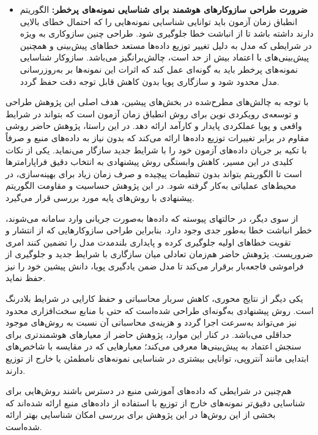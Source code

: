 \begin{itemize}
	\item \textbf{ضرورت طراحی سازوکار‌های هوشمند برای شناسایی نمونه‌های پرخطر:}
	الگوریتم انطباق زمان آزمون باید توانایی شناسایی نمونه‌هایی را که احتمال خطای بالایی دارند داشته باشد 
	تا از انباشت خطا جلوگیری شود. طراحی چنین سازوکاری به ویژه در شرایطی که مدل به دلیل تغییر توزیع داده‌ها 
	مستعد خطاهای پیش‌بینی و همچنین پیش‌بینی‌های با {اعتماد بیش از حد} است، 
	چالش‌برانگیز می‌باشد. سازوکار شناسایی {نمونه‌های پرخطر} باید به گونه‌ای عمل کند 
	که اثرات این نمونه‌ها بر به‌روزرسانی مدل محدود شود و سازگاری پویا بدون کاهش قابل توجه دقت حفظ گردد.
\end{itemize}



با توجه به چالش‌های مطرح‌شده در بخش‌های پیشین، هدف اصلی این پژوهش طراحی و توسعه‌ی رویکردی نوین برای روش انطباق زمان آزمون است که بتواند در شرایط واقعی و پویا عملکردی پایدار و کارآمد ارائه دهد. در این راستا، پژوهش حاضر روشی مقاوم در برابر تغییرات توزیع داده‌ها ارائه می‌کند که بدون نیاز به داده‌های منبع و صرفاً با تکیه بر جریان داده‌های آزمون خود را با شرایط جدید سازگار می‌نماید. یکی از نکات کلیدی در این مسیر، کاهش وابستگی روش پیشنهادی به انتخاب دقیق فراپارامترها است تا الگوریتم بتواند بدون تنظیمات پیچیده و صرف زمان زیاد برای بهینه‌سازی، در محیط‌های عملیاتی به‌کار گرفته شود. در این پژوهش حساسیت و مقاومت الگوریتم پیشنهادی با روش‌های پایه مورد بررسی قرار می‌گیرد.

از سوی دیگر، در حالتهای پیوسته که داده‌ها به‌صورت جریانی وارد سامانه می‌شوند، خطر انباشت خطا به‌طور جدی وجود دارد. بنابراین طراحی سازوکار‌هایی که از انتشار و تقویت خطاهای اولیه جلوگیری کرده و پایداری بلندمدت مدل را تضمین کنند امری ضروریست. پژوهش حاضر هم‌زمان تعادلی میان سازگاری با شرایط جدید و جلوگیری از فراموشی فاجعه‌بار برقرار می‌کند تا مدل ضمن یادگیری پویا، دانش پیشین خود را نیز حفظ نماید.

یکی دیگر از نتایج محوری، کاهش سربار محاسباتی و حفظ کارایی در شرایط بلادرنگ است. روش پیشنهادی به‌گونه‌ای طراحی شده‌است که حتی با منابع سخت‌افزاری محدود نیز می‌تواند به‌سرعت اجرا گردد و هزینه‌ی محاسباتی آن نسبت به روش‌های موجود حداقلی می‌باشد. در کنار این موارد، پژوهش حاضر از معیارهای هوشمندتری برای سنجش اعتماد به پیش‌بینی‌ها معرفی می‌کند؛ معیارهایی که در مقایسه با شاخص‌های ابتدایی مانند آنتروپی، توانایی بیشتری در شناسایی نمونه‌های نامطمئن یا خارج از توزیع دارند.

هم‌چنین در شرایطی که داده‌های آموزشی منبع در دسترس باشند روش‌هایی برای شناسایی دقیق‌تر نمونه‌های خارج از توزیع با استفاده از داده‌های منبع ارائه شده‌اند که بخشی از این روش‌ها در این پژوهش برای بررسی امکان شناسایی بهتر ارائه شده‌است.

